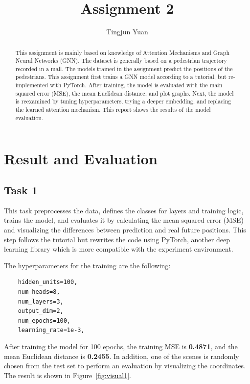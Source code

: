 \documentclass[conference]{IEEEtran}
\begin{document}
\title{Assignment 2}

\author{Tingjun Yuan}

\maketitle

\begin{abstract}
This assignment is mainly based on knowledge of Attention Mechanisms and
Graph Neural Networks (GNN). The dataset is generally based on a pedestrian
trajectory recorded in a mall. The models trained in the assignment predict
the positions of the pedestrians. This assignment first trains a GNN model
according to a tutorial, but re-implemented with PyTorch. After training, the
model is evaluated with the main squared error (MSE), the mean Euclidean
distance, and plot graphs. Next, the model is reexamined by tuning
hyperparameters, trying a deeper embedding, and replacing the learned attention
mechanism. This report shows the results of the model evaluation.
\end{abstract}

\section{Result and Evaluation}

\subsection*{Task 1}

This task preprocesses the data, defines the classes for layers and training
logic, trains the model, and evaluates it by calculating the mean squared error
(MSE) and visualizing the differences between prediction and real future
positions. This step follows the tutorial \cite{cite:tut} but rewrites the code
using PyTorch, another deep learning library which is more compatible with the
experiment environment.

The hyperparameters for the training are the following:

\begin{verbatim}
    hidden_units=100,
    num_heads=8,
    num_layers=3,
    output_dim=2,
    num_epochs=100,
    learning_rate=1e-3,
\end{verbatim}

After training the model for 100 epochs, the training MSE is \textbf{0.4871},
and the mean Euclidean distance is \textbf{0.2455}. In addition, one of
the scenes is randomly chosen from the test set to perform an evaluation by
visualizing the coordinates. The result is shown in Figure~\ref{fig:visual1}.
\end{document}
